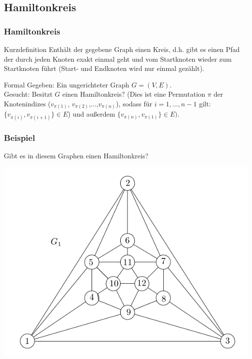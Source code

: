 \subsection{Hamiltonkreis}
\begin{frame}
	\frametitle{Hamiltonkreis}
	\begin{block}{Kurzdefinition}
	Enthält der gegebene Graph einen Kreis, d.h. gibt es einen Pfad der durch jeden Knoten exakt einmal geht und vom Startknoten wieder zum Startknoten führt (Start- und Endknoten wird nur einmal gezählt).
	\end{block}
	\begin{block}{Formal}
	Gegeben: Ein ungerichteter Graph $G=(V,E)$.\\
	Gesucht: Besitzt $G$ einen Hamiltonkreis? (Dies ist eine Permutation $\pi$ der Knotenindizes ($v_{\pi(1)}$, $v_{\pi(2)}$,...,$v_{\pi(n)}$), sodass für $i=1,...,n-1$ gilt: $\{v_{\pi(i)},v_{\pi(i+1)}\}\in E$) und 
außerdem $\{v_{\pi(n)},v_{\pi(1)}\} \in E)$.
	\end{block}
\end{frame}
\begin{frame}
	\frametitle{Beispiel}
	Gibt es in diesem Graphen einen Hamiltonkreis?
	\begin{center}
		\includegraphics[scale=0.4]{images/4_Faerben}
	\end{center}
\end{frame}
